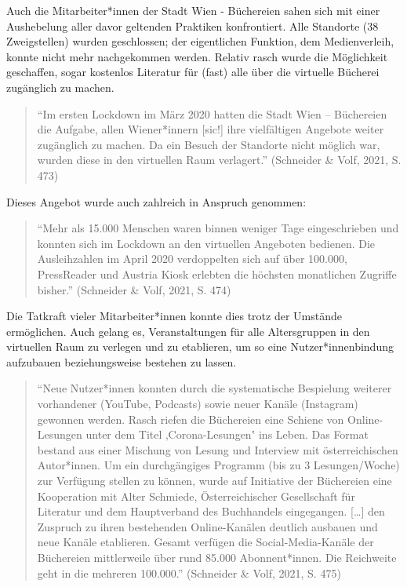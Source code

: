 \documentclass[a4paper,
fontsize=11pt,
oneside,
numbers=noperiodatend,
parskip=half-,
bibliography=totoc,
final
]{scrartcl}
\begin{document}
Auch die Mitarbeiter*innen der Stadt Wien - Büchereien sahen sich mit
einer Aushebelung aller davor geltenden Praktiken konfrontiert. Alle
Standorte (38 Zweigstellen) wurden geschlossen; der eigentlichen
Funktion, dem Medienverleih, konnte nicht mehr nachgekommen werden.
Relativ rasch wurde die Möglichkeit geschaffen, sogar kostenlos
Literatur für (fast) alle über die virtuelle Bücherei zugänglich zu
machen.

\begin{quote}
\enquote{Im ersten Lockdown im März 2020 hatten die Stadt Wien --
Büchereien die Aufgabe, allen Wiener*innern {[}sic!{]} ihre vielfältigen
Angebote weiter zugänglich zu machen. Da ein Besuch der Standorte nicht
möglich war, wurden diese in den virtuellen Raum verlagert.} (Schneider
\& Volf, 2021, S. 473)
\end{quote}

Dieses Angebot wurde auch zahlreich in Anspruch genommen:

\begin{quote}
\enquote{Mehr als 15.000 Menschen waren binnen weniger Tage
eingeschrieben und konnten sich im Lockdown an den virtuellen Angeboten
bedienen. Die Ausleihzahlen im April 2020 verdoppelten sich auf über
100.000, PressReader und Austria Kiosk erlebten die höchsten monatlichen
Zugriffe bisher.} (Schneider \& Volf, 2021, S. 474)
\end{quote}

Die Tatkraft vieler Mitarbeiter*innen konnte dies trotz der Umstände
ermöglichen. Auch gelang es, Veranstaltungen für alle Altersgruppen in
den virtuellen Raum zu verlegen und zu etablieren, um so eine
Nutzer*innenbindung aufzubauen beziehungsweise bestehen zu lassen.

\begin{quote}
\enquote{Neue Nutzer*innen konnten durch die systematische Bespielung
weiterer vorhandener (YouTube, Podcasts) sowie neuer Kanäle (Instagram)
gewonnen werden. Rasch riefen die Büchereien eine Schiene von
Online-Lesungen unter dem Titel ‚Corona-Lesungen‛ ins Leben. Das Format
bestand aus einer Mischung von Lesung und Interview mit österreichischen
Autor*innen. Um ein durchgängiges Programm (bis zu 3 Lesungen/Woche) zur
Verfügung stellen zu können, wurde auf Initiative der Büchereien eine
Kooperation mit Alter Schmiede, Österreichischer Gesellschaft für
Literatur und dem Hauptverband des Buchhandels eingegangen. {[}\ldots{]}
den Zuspruch zu ihren bestehenden Online-Kanälen deutlich ausbauen und
neue Kanäle etablieren. Gesamt verfügen die Social-Media-Kanäle der
Büchereien mittlerweile über rund 85.000 Abonnent*innen. Die Reichweite
geht in die mehreren 100.000.} (Schneider \& Volf, 2021, S. 475)
\end{quote}
\end{document}
